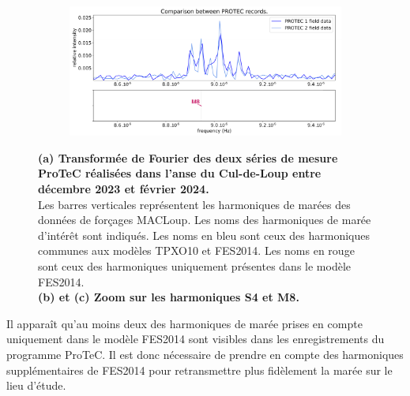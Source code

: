 \documentclass[10pt,a4paper,titlepage]{article}
\begin{document}
\begin{figure}[H]
    \begin{subfigure}{0.45\linewidth}
        \centering
        \includegraphics[width=\linewidth]{../images/post_traitement/PROTEC1_PROTEC2_analyse_zoom3.pdf}
        \caption{}
    \end{subfigure}
    \caption{
        \textbf{(a) Transformée de Fourier des deux séries de mesure ProTeC réalisées dans l'anse du Cul-de-Loup entre décembre 2023 et février 2024.}\\
        Les barres verticales représentent les harmoniques de marées des données de forçages MACLoup.
        Les noms des harmoniques de marée d'intérêt sont indiqués.
        Les noms en bleu sont ceux des harmoniques communes aux modèles TPXO10 et FES2014.
        Les noms en rouge sont ceux des harmoniques uniquement présentes dans le modèle FES2014.
        \\
        \textbf{(b) et (c) Zoom sur les harmoniques S4 et M8.}
    }
    \label{fig:ana_signaux_protec}
\end{figure}

Il apparaît qu'au moins deux des harmoniques de marée prises en compte uniquement dans le modèle FES2014 sont visibles dans les enregistrements du programme ProTeC.
Il est donc nécessaire de prendre en compte des harmoniques supplémentaires de FES2014 pour retransmettre plus fidèlement la marée sur le lieu d'étude.
\end{document}
